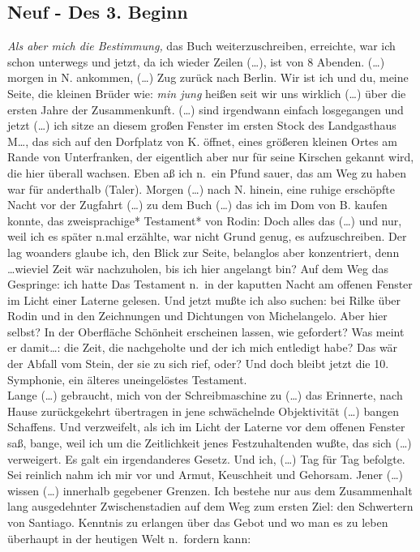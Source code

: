 \documentclass[
]{article}
\author{}
\date{\vspace{-2.5em}}
\begin{document}
\subsection{Neuf - Des 3. Beginn}\label{neuf---des-3.-beginn}

\emph{Als aber mich die Bestimmung,} das Buch weiterzuschreiben,
erreichte, war ich schon unterwegs und jetzt, da ich wieder Zeilen
(\ldots), ist von 8 Abenden. (\ldots) morgen in N. ankommen, (\ldots)
Zug zurück nach Berlin. Wir ist ich und du, meine Seite, die kleinen
Brüder wie: \emph{min jung }heißen seit wir uns wirklich (\ldots) über
die ersten Jahre der Zusammenkunft. (\ldots) sind irgendwann einfach
losgegangen und jetzt (\ldots) ich sitze an diesem großen Fenster im
ersten Stock des Landgasthaus M\ldots, das sich auf den Dorfplatz von K.
öffnet, eines größeren kleinen Ortes am Rande von Unterfranken, der
eigentlich aber nur für seine Kirschen gekannt wird, die hier überall
wachsen. Eben aß ich n.~ein Pfund sauer, das am Weg zu haben war für
anderthalb (Taler). Morgen (\ldots) nach N. hinein, eine ruhige
erschöpfte Nacht vor der Zugfahrt (\ldots) zu dem Buch (\ldots) das ich
im Dom von B. kaufen konnte, das zweisprachige* Testament* von Rodin:
Doch alles das (\ldots) und nur, weil ich es später n.mal erzählte, war
nicht Grund genug, es aufzuschreiben. Der lag woanders glaube ich, den
Blick zur Seite, belanglos aber konzentriert, denn\\
\ldots wieviel Zeit wär nachzuholen, bis ich hier angelangt bin? Auf dem
Weg das Gespringe: ich hatte Das Testament n.~in der kaputten Nacht am
offenen Fenster im Licht einer Laterne gelesen. Und jetzt mußte ich also
suchen: bei Rilke über Rodin und in den Zeichnungen und Dichtungen von
Michelangelo. Aber hier selbst? In der Oberfläche Schönheit erscheinen
lassen, wie gefordert? Was meint er damit\ldots: die Zeit, die
nachgeholte und der ich mich entledigt habe? Das wär der Abfall vom
Stein, der sie zu sich rief, oder? Und doch bleibt jetzt die 10.
Symphonie, ein älteres uneingelöstes Testament.\\
Lange (\ldots) gebraucht, mich von der Schreibmaschine zu (\ldots) das
Erinnerte, nach Hause zurückgekehrt übertragen in jene schwächelnde
Objektivität (\ldots) bangen Schaffens. Und verzweifelt, als ich im
Licht der Laterne vor dem offenen Fenster saß, bange, weil ich um die
Zeitlichkeit jenes Festzuhaltenden wußte, das sich (\ldots) verweigert.
Es galt ein irgendanderes Gesetz. Und ich, (\ldots) Tag für Tag
befolgte. Sei reinlich nahm ich mir vor und Armut, Keuschheit und
Gehorsam. Jener (\ldots) wissen (\ldots) innerhalb gegebener Grenzen.
Ich bestehe nur aus dem Zusammenhalt lang ausgedehnter Zwischenstadien
auf dem Weg zum ersten Ziel: den Schwertern von Santiago. Kenntnis zu
erlangen über das Gebot und wo man es zu leben überhaupt in der heutigen
Welt n.~fordern kann:
\end{document}
